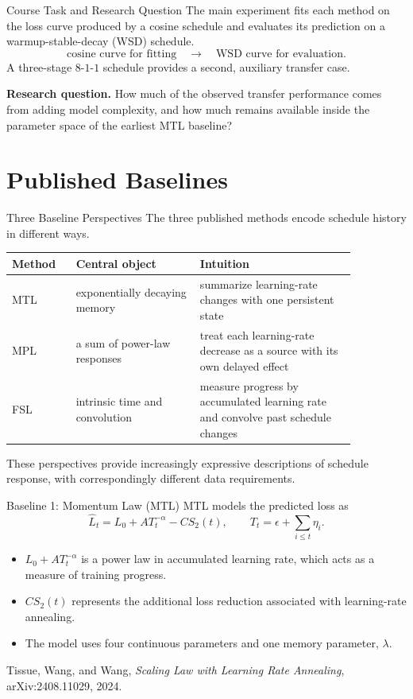 \documentclass[aspectratio=169]{beamer}
\newcommand{\source}[1]{\vfill{\tiny\color{sourcegray}#1}}
\begin{document}
\begin{frame}{Course Task and Research Question}
  The main experiment fits each method on the loss curve produced by a cosine schedule and evaluates its prediction on a warmup-stable-decay (WSD) schedule.
  \[
    \text{cosine curve for fitting}
    \quad\longrightarrow\quad
    \text{WSD curve for evaluation}.
  \]
  A three-stage \(8\)-\(1\)-\(1\) schedule provides a second, auxiliary transfer case.
  \vspace{0.6em}

  \textbf{Research question.} How much of the observed transfer performance comes from adding model complexity, and how much remains available inside the parameter space of the earliest MTL baseline?
\end{frame}

\section{Published Baselines}

\begin{frame}{Three Baseline Perspectives}
  The three published methods encode schedule history in different ways.
  \begin{center}
  \small
  \begin{tabular}{p{0.16\linewidth}p{0.31\linewidth}p{0.39\linewidth}}
    \toprule
    Method & Central object & Intuition \\
    \midrule
    MTL & exponentially decaying memory & summarize learning-rate changes with one persistent state \\
    MPL & a sum of power-law responses & treat each learning-rate decrease as a source with its own delayed effect \\
    FSL & intrinsic time and convolution & measure progress by accumulated learning rate and convolve past schedule changes \\
    \bottomrule
  \end{tabular}
  \end{center}
  These perspectives provide increasingly expressive descriptions of schedule response, with correspondingly different data requirements.
\end{frame}

\begin{frame}{Baseline 1: Momentum Law (MTL)}
  MTL models the predicted loss as
  \[
    \widehat L_t
    =
    L_0 + A T_t^{-\alpha} - C S_2(t),
    \qquad
    T_t=\epsilon+\sum_{i\leq t}\eta_i .
  \]
  \begin{itemize}
    \item \(L_0+A T_t^{-\alpha}\) is a power law in accumulated learning rate, which acts as a measure of training progress.
    \item \(C S_2(t)\) represents the additional loss reduction associated with learning-rate annealing.
    \item The model uses four continuous parameters and one memory parameter, \(\lambda\).
  \end{itemize}
  \source{Tissue, Wang, and Wang, \emph{Scaling Law with Learning Rate Annealing}, arXiv:2408.11029, 2024.}
\end{frame}
\end{document}
